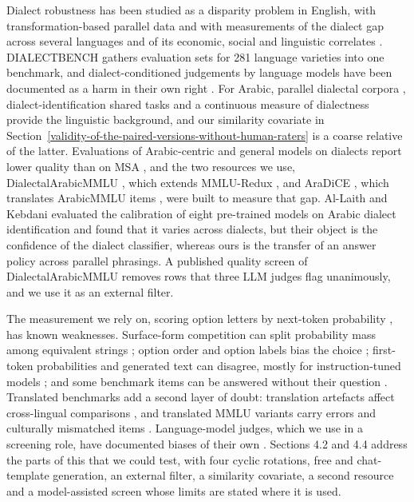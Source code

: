 \documentclass[applsci,article,submit,pdftex,oneauthor]{Definitions/mdpi}
\begin{document}
Dialect robustness has been studied as a disparity problem in English, with transformation-based parallel data \cite{ziems2022value, ziems2023multivalue} and with measurements of the dialect gap across several languages and of its economic, social and linguistic correlates \cite{kantharuban2023quantifying}. DIALECTBENCH \cite{faisal2024dialectbench} gathers evaluation sets for 281 language varieties into one benchmark, and dialect-conditioned judgements by language models have been documented as a harm in their own right \cite{hofmann2024dialect}. For Arabic, parallel dialectal corpora \cite{bouamor2018madar}, dialect-identification shared tasks \cite{abdulmageed2021nadi} and a continuous measure of dialectness \cite{keleg2023aldi} provide the linguistic background, and our similarity covariate in Section~\ref{validity-of-the-paired-versions-without-human-raters} is a coarse relative of the latter. Evaluations of Arabic-centric and general models on dialects report lower quality than on MSA \cite{huang2024acegpt, abdelali2024larabench, robinson2025alqasida}, and the two resources we use, DialectalArabicMMLU \cite{altakrori2026dialectalarabicmmlu}, which extends MMLU-Redux \cite{gema2025mmluredux, hendrycks2021mmlu}, and AraDiCE \cite{mousi2025aradice}, which translates ArabicMMLU items \cite{koto2024arabicmmlu}, were built to measure that gap. Al-Laith and Kebdani \cite{allaith2025calibration} evaluated the calibration of eight pre-trained models on Arabic dialect identification and found that it varies across dialects, but their object is the confidence of the dialect classifier, whereas ours is the transfer of an answer policy across parallel phrasings. A published quality screen of DialectalArabicMMLU \cite{ifm2026verified} removes rows that three LLM judges flag unanimously, and we use it as an external filter.

The measurement we rely on, scoring option letters by next-token probability \cite{robinson2023leveraging}, has known weaknesses. Surface-form competition can split probability mass among equivalent strings \cite{holtzman2021surface}; option order and option labels bias the choice \cite{zheng2024robust, pezeshkpour2024sensitivity, alzahrani2024benchmarks}; first-token probabilities and generated text can disagree, mostly for instruction-tuned models \cite{wang2024myanswer, lyu2024beyond}; and some benchmark items can be answered without their question \cite{balepur2024artifacts}. Translated benchmarks add a second layer of doubt: translation artefacts affect cross-lingual comparisons \cite{artetxe2020translation}, and translated MMLU variants carry errors and culturally mismatched items \cite{singh2024global}. Language-model judges, which we use in a screening role, have documented biases of their own \cite{zheng2023judging, chiang2023can}. Sections 4.2 and 4.4 address the parts of this that we could test, with four cyclic rotations, free and chat-template generation, an external filter, a similarity covariate, a second resource and a model-assisted screen whose limits are stated where it is used.
\end{document}
